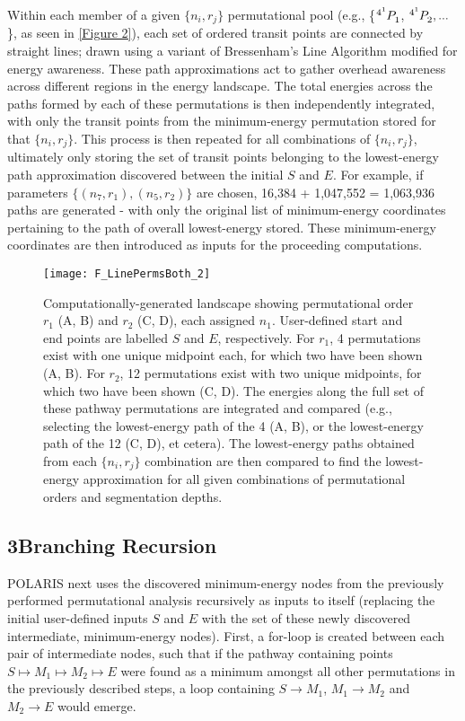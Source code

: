 \documentclass[twocolumn]{biophys-new}
\begin{document}
Within each member of a given $\{n_{i}, r_{j}\}$ permutational pool (e.g., \{$\tensor*[^{4^{1}}_{}]{P}{^{}_1}$, $\tensor*[^{4^{1}}_{}]{P}{^{}_2}, ... $\}, as seen in \autoref{Figure 2}), each set of ordered transit points are connected by straight lines; drawn using a variant of Bressenham's Line Algorithm modified for energy awareness. These path approximations act to gather overhead awareness across different regions in the energy landscape. The total energies across the paths formed by each of these permutations is then independently integrated, with only the transit points from the minimum-energy permutation stored for that $\{n_{i}, r_{j}\}$. This process is then repeated for all combinations of $\{n_{i}, r_{j}\}$, ultimately only storing the set of transit points belonging to the lowest-energy path approximation discovered between the initial $S$ and $E$. For example, if parameters $\{(n_7, r_1), (n_5, r_2)\}$ are chosen, 16,384 + 1,047,552 = 1,063,936 paths are generated - with only the original list of minimum-energy coordinates pertaining to the path of overall lowest-energy stored. These minimum-energy coordinates are then introduced as inputs for the proceeding computations.

\setcounter{figure}{1} 
\begin{figure}[hbt!]
\centering
\texttt{[image: F\_LinePermsBoth\_2]}
\caption{Computationally-generated landscape showing permutational order $r_{1}$ (A, B) and $r_{2}$ (C, D), each assigned $n_{1}$. User-defined start and end points are labelled $S$ and $E$, respectively. For $r_{1}$, 4 permutations exist with one unique midpoint each, for which two have been shown (A, B). For $r_{2}$, 12 permutations exist with two unique midpoints, for which two have been shown (C, D). The energies along the full set of these pathway permutations are integrated and compared (e.g., selecting the lowest-energy path of the 4 (A, B), or the lowest-energy path of the 12 (C, D), et cetera). The lowest-energy paths obtained from each $\{n_{i}, r_{j}\}$ combination are then compared to find the lowest-energy approximation for all given combinations of permutational orders and segmentation depths.}
\label{Figure 2}
\end{figure}

\subsection*{3\quad Branching Recursion}

POLARIS next uses the discovered minimum-energy nodes from the previously performed permutational analysis recursively as inputs to itself (replacing the initial user-defined inputs $S$ and $E$ with the set of these newly discovered intermediate, minimum-energy nodes). First, a for-loop is created between each pair of intermediate nodes, such that if the pathway containing points $S\mapsto M_{1}\mapsto M_{2}\mapsto E$ were found as a minimum amongst all other permutations in the previously described steps, a loop containing $S\rightarrow M_{1}$, $M_{1}\rightarrow M_{2}$ and $M_{2}\rightarrow E$ would emerge.
\end{document}
